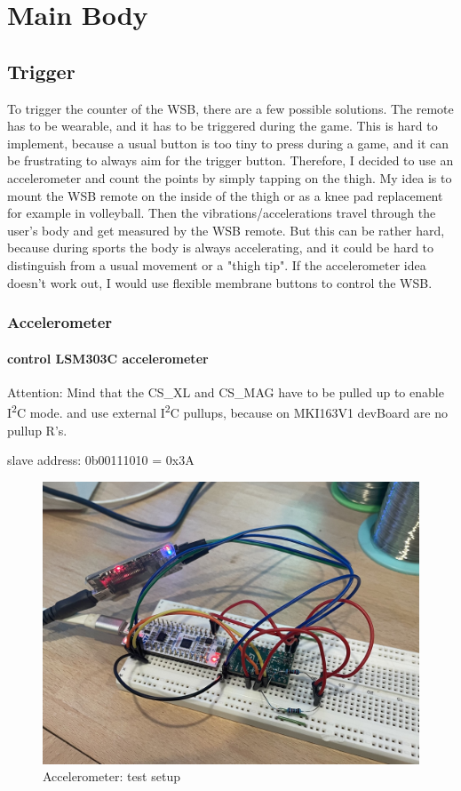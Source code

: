 \chapter{Main Body}
\label{cha:Main Body}

\section{Trigger}
\label{sec:Trigger}
To trigger the counter of the WSB, there are a few possible solutions. The remote has to be wearable, and it has to be triggered during the game. This is hard to implement, because a usual button is too tiny to press during a game, and it can be frustrating to always aim for the trigger button. Therefore, I decided to use an accelerometer and count the points by simply tapping on the thigh. My idea is to mount the WSB remote on the inside of the thigh or as a knee pad replacement for example in volleyball. Then the vibrations/accelerations travel through the user's body and get measured by the WSB remote. But this can be rather hard, because during sports the body is always accelerating, and it could be hard to distinguish from a usual movement or a "thigh tip". If the accelerometer idea doesn't work out, I would use flexible membrane buttons to control the WSB.

\subsection{Accelerometer}
\label{ssec:Accelerometer}
\subsubsection{control LSM303C accelerometer}
Attention: Mind that the CS\_XL and CS\_MAG have to be pulled up to enable I\textsuperscript{2}C mode. and use external I\textsuperscript{2}C pullups, because on MKI163V1 devBoard are no pullup R's.

slave address: 0b00111010 = 0x3A \cite{DS_LSM303C}

\begin{figure}[H]
	\centering
	\includegraphics[width=11.5cm]{Resources/accTestLab.jpeg}
	\caption{Accelerometer: test setup}
	\label{fig:accTestLab}
\end{figure}

